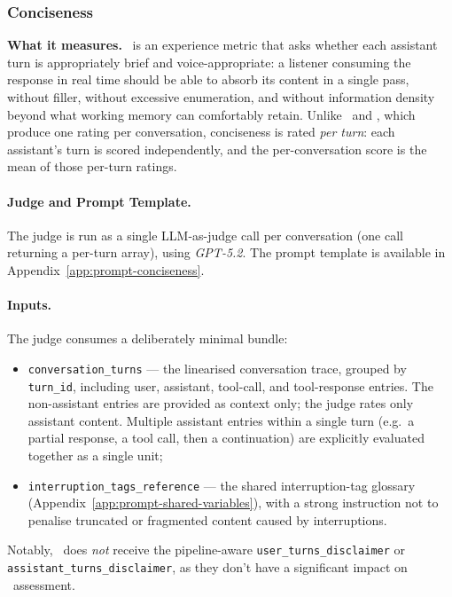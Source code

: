 \subsubsection{Conciseness}
\label{app:metric-conciseness}

\textbf{What it measures.} \metricconcise~is an experience metric that asks whether each assistant turn is appropriately brief and voice-appropriate: a listener consuming the response in real time should be able to absorb its content in a single pass, without filler, without excessive enumeration, and without information density beyond what working memory can comfortably retain. Unlike \metricfaithfulness~and \metricconversationprogression, which produce one rating per conversation, conciseness is rated \emph{per turn}: each assistant's turn is scored independently, and the per-conversation score is the mean of those per-turn ratings.

\paragraph{Judge and Prompt Template.} The judge is run as a single LLM-as-judge call per conversation (one call returning a per-turn array), using \emph{GPT-5.2}. The prompt template is available in Appendix~\ref{app:prompt-conciseness}.

\paragraph{Inputs.} The judge consumes a deliberately minimal bundle:
\begin{itemize}
    \item \texttt{conversation\_turns} --- the linearised conversation trace, grouped by \texttt{turn\_id}, including user, assistant, tool-call, and tool-response entries. The non-assistant entries are provided as context only; the judge rates only assistant content. Multiple assistant entries within a single turn (e.g.\ a partial response, a tool call, then a continuation) are explicitly evaluated together as a single unit;
    \item \texttt{interruption\_tags\_reference} --- the shared interruption-tag glossary (Appendix~\ref{app:prompt-shared-variables}), with a strong instruction not to penalise truncated or fragmented content caused by interruptions.
\end{itemize}
Notably, \metricconcise~does \emph{not} receive the pipeline-aware \texttt{user\_turns\_disclaimer} or \texttt{assistant\_turns\_disclaimer}, as they don't have a significant impact on \metricconcise~assessment.


